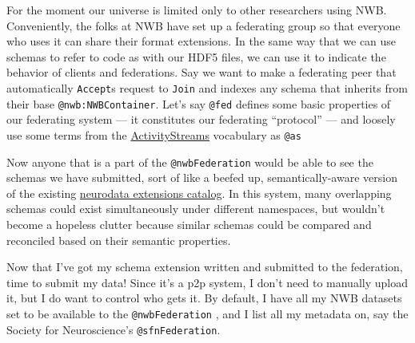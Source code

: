 For the moment our universe is limited only to other researchers using
NWB. Conveniently, the folks at NWB have set up a federating group so
that everyone who uses it can share their format extensions. In the same
way that we can use schemas to refer to code as with our HDF5 files, we
can use it to indicate the behavior of clients and federations. Say we
want to make a federating peer that automatically \texttt{Accept}s
request to \texttt{Join} and indexes any schema that inherits from their
base \texttt{@nwb:NWBContainer}. Let's say \texttt{@fed} defines some
basic properties of our federating system --- it constitutes our
federating ``protocol'' --- and loosely use some terms from the
\href{https://www.w3.org/ns/activitystreams\#class-definitions}{ActivityStreams}
vocabulary as \texttt{@as}

\begin{Shaded}
\begin{Highlighting}[]
\end{Highlighting}
\end{Shaded}

Now anyone that is a part of the \texttt{@nwbFederation} would be able
to see the schemas we have submitted, sort of like a beefed up,
semantically-aware version of the existing
\href{https://nwb-extensions.github.io/}{neurodata extensions catalog}.
In this system, many overlapping schemas could exist simultaneously
under different namespaces, but wouldn't become a hopeless clutter
because similar schemas could be compared and reconciled based on their
semantic properties.

Now that I've got my schema extension written and submitted to the
federation, time to submit my data! Since it's a p2p system, I don't
need to manually upload it, but I do want to control who gets it. By
default, I have all my NWB datasets set to be available to the
\texttt{@nwbFederation} , and I list all my metadata on, say the Society
for Neuroscience's \texttt{@sfnFederation}.

\begin{Shaded}
\begin{Highlighting}[]


\end{Highlighting}
\end{Shaded}


